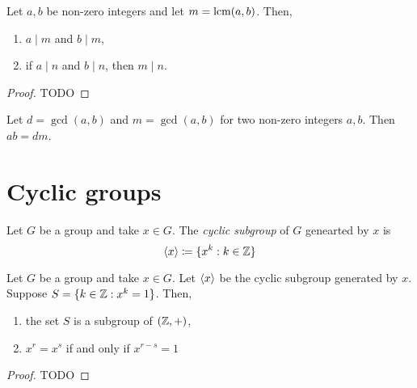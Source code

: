\begin{proposition}
  Let $a, b$ be non-zero integers and let  $m = \operatorname{lcm}(a, b)$. Then,
  \begin{enumerate}
    \item $a \mid m$ and  $b\mid m$,
    \item if $a \mid n$ and  $b\mid n$, then  $m \mid n$.
  \end{enumerate}
\end{proposition}
\begin{proof}
  TODO
\end{proof}

\begin{corollary}
  Let $d = \gcd(a, b)$ and $m = \gcd(a, b)$ for two non-zero integers  $a, b$. Then $ab = dm$.
\end{corollary}

\section{Cyclic groups}

\begin{definition}
  Let $G$ be a group and take $x \in G$. The \emph{cyclic subgroup} of $G$ genearted by $x$ is \[
    \langle x\rangle \coloneq \{x^{k} : k \in \mathbb{Z}\}
  \] 
\end{definition}

\begin{proposition}
  Let $G$ be a group and take $x \in G$. Let $\langle x\rangle$ be the cyclic subgroup generated by $x$. Suppose $S = \{k \in \mathbb{Z} : x^{k} = 1\}$. Then,
  \begin{enumerate}
    \item the set $S$ is a subgroup of $(\mathbb{Z}, +)$,
    \item $x^{r} = x^{s}$ if and only if $x^{r-s} = 1$ 
  \end{enumerate}
\end{proposition}
\begin{proof}
  TODO
\end{proof}

